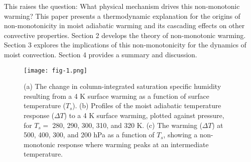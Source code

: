 \documentclass[draft]{ametsocV6.1}
\begin{document}
This raises the question: What physical mechanism drives this non-monotonic warming? This paper presents a thermodynamic explanation for the origins of non-monotonicity in moist adiabatic warming and its cascading effects on other convective properties. Section 2 develops the theory of non-monotonic warming. Section 3 explores the implications of this non-monotonicity for the dynamics of moist convection. Section 4 provides a summary and discussion.

\begin{figure}[htbp]
 \centering
 \texttt{[image: fig-1.png]}\\
\caption{(a) The change in column-integrated saturation specific humidity resulting from a 4 K surface warming as a function of surface temperature ($T_s$). (b) Profiles of the moist adiabatic temperature response ($\Delta T$) to a 4 K surface warming, plotted against pressure, for $T_s = $ 280, 290, 300, 310, and 320 K. (c) The warming ($\Delta T$) at 500, 400, 300, and 200 hPa as a function of $T_s$, showing a non-monotonic response where warming peaks at an intermediate temperature.}
\label{fig:fig-1}
\end{figure}
\end{document}

